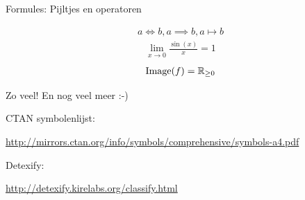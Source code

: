 \documentclass[presentatie.tex]{subfiles}
\begin{document}

\begin{frame}
	{Formules: Pijltjes en operatoren}


	\vspace{-10pt}
	\begin{align*}
		a \iff b, a\implies b, a\mapsto b
	\end{align*}
	\begin{align*}
		\lim_{x\to 0}\frac{\sin(x)}{x} = 1
	\end{align*}
	\begin{align*}
		\operatorname{Image}(f) = \mathbb{R}_{\geq 0}
	\end{align*}
\end{frame}

\begin{frame}
	\begin{center}
		Zo veel! En nog veel meer :-)
	\end{center}		

	\begin{center}
		CTAN symbolenlijst:\par
		\url{http://mirrors.ctan.org/info/symbols/comprehensive/symbols-a4.pdf}
	\end{center}
	
	\begin{center}
		Detexify:\par
		\url{http://detexify.kirelabs.org/classify.html}
	\end{center}
\end{frame}

\end{document}
